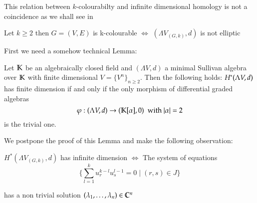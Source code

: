 This relation between $k$-colourabilty and infinite dimensional homology is not a coincidence as we shall see in

 \begin{Theorem}
 \label{thm:KColourEquivalentToNonEllipticity}
  Let $k \geq 2$ then 
   $G = (V,E)$ is k-colourable $\iff$ $(\Lambda V_{(G,k)},d)$ is not elliptic
 \end{Theorem}
 
 First we need a somehow technical Lemma:
 \begin{Lemma}
 \label{lma:IfAndOnlyIfNonTrivialMorphism}
  Let $\mathbb{K}$ be an algebraically closed field and $(\Lambda V,d)$ a minimal Sullivan
  algebra over $\mathbb{K}$ with finite dimensional $V = {\lbrace V^n \rbrace}_{n \geq 2}$. Then the following holds:\newline
  $H^*(\Lambda V,d)$ has finite dimension if and only if   
  the only morphism of differential graded algebras 
  $$ \varphi : (\Lambda V,d) \to (\mathbb{K}[\alpha],0) \; \text{ with $|\alpha| = 2$} $$ 
  is the trivial one.
 \end{Lemma}
  
  We postpone the proof of this Lemma and make the following observation:
  
 
\begin{Lemma}
\label{lma:cohomoly+equations}
 $H^*(\Lambda V_{(G,k)}, d)$ has infinite dimension $\iff$ The system of equations \\
 \begin{equation}
 \label{systemofequations}
 {\lbrace \sum_{l = 1}^k u_r^{k - l} u_s^{l - 1} = 0 \; | \; (r,s) \in J \rbrace}  
 \end{equation}
 
 has a non trivial solution 
 $(\lambda_1 , \dotsc, \lambda_n) \in \mathbb{C}^n$
\end{Lemma}

